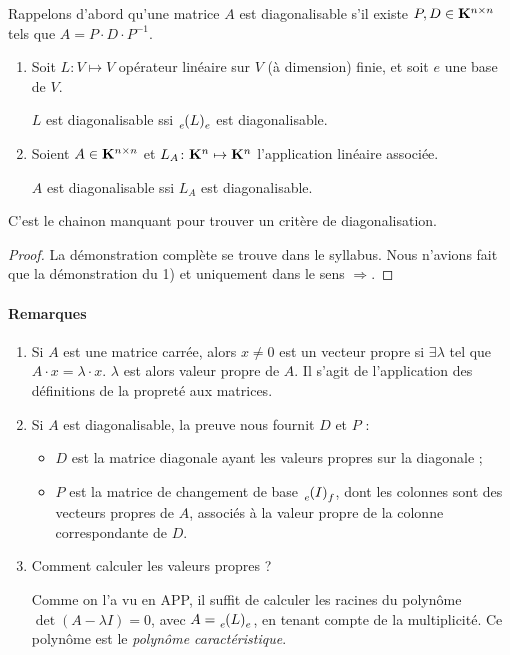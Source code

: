 Rappelons d'abord qu'une matrice $A$ est diagonalisable s'il existe $P, D \in \mathbf{K}^{n\times n}$ tels que $A=P\cdot D\cdot P^{-1}$.

\begin{propriete}
\begin{enumerate}
\item Soit $L\colon V\mapsto V$ opérateur linéaire sur $V$ (à dimension) finie, et soit $e$ une base de $V$.

$L$ est diagonalisable ssi $\elfbase{e}{L}{e}$ est diagonalisable.
\item Soient $A\in \mathbf{K}^{n\times n}$ et $L_A\colon \mathbf{K}^n\mapsto \mathbf{K}^n$ l'application linéaire associée.

$A$ est diagonalisable ssi $L_A$ est diagonalisable.
\end{enumerate}
\end{propriete}

C'est le chainon manquant pour trouver un critère de diagonalisation.

\begin{proof}
La démonstration complète se trouve dans le syllabus. Nous n'avions fait que la démonstration du 1) et uniquement dans le sens $\Rightarrow$.
\end{proof}

\paragraph{Remarques}

\begin{enumerate}
\item Si $A$ est une matrice carrée, alors $x\neq 0$ est un vecteur propre si $\exists \lambda$ tel que $A\cdot x = \lambda \cdot x$. $\lambda$ est alors valeur propre de $A$. Il s'agit de l'application des définitions de \og la propreté \fg{} aux matrices.
\item Si $A$ est diagonalisable, la preuve nous fournit $D$ et $P$ :
\begin{itemize}
\item $D$ est la matrice diagonale ayant les valeurs propres sur la diagonale ;
\item $P$ est la matrice de changement de base $\elfbase{e}{I}{f}$, dont les colonnes sont des vecteurs propres de $A$, associés à la valeur propre de la colonne correspondante de $D$.
\end{itemize}
\item Comment calculer les valeurs propres ?

Comme on l'a vu en APP, il suffit de calculer les racines du polynôme $\det(A-\lambda I)=0$, avec $A=\elfbase{e}{L}{e}$, en tenant compte de la multiplicité. Ce polynôme est le \emph{polynôme caractéristique}.
\end{enumerate}

